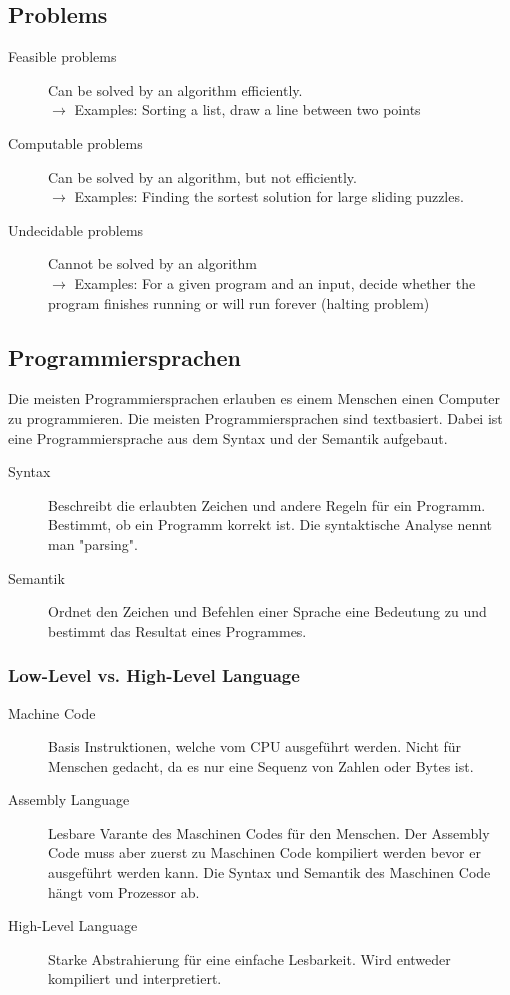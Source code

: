 \documentclass[12pt, a4paper, oneside]{article}
\begin{document}
\subsection{Problems}
\begin{description}
    \item[Feasible problems] Can be solved by an algorithm efficiently.\\
    $\rightarrow$ Examples: Sorting a list, draw a line between two points
    \item[Computable problems] Can be solved by an algorithm, but not efficiently.\\
    $\rightarrow$ Examples: Finding the sortest solution for large sliding puzzles.
    \item[Undecidable problems] Cannot be solved by an algorithm\\
    $\rightarrow$ Examples: For a given program and an input, decide whether the program finishes running or will run forever (halting problem)
\end{description}


\subsection{Programmiersprachen}
Die meisten Programmiersprachen erlauben es einem Menschen einen Computer zu programmieren. Die meisten Programmiersprachen sind textbasiert. Dabei ist eine Programmiersprache aus dem Syntax und der Semantik aufgebaut.

\begin{description}
    \item[Syntax] Beschreibt die erlaubten Zeichen und andere Regeln für ein Programm. Bestimmt, ob ein Programm korrekt ist. Die syntaktische Analyse nennt man "parsing".
    \item[Semantik] Ordnet den Zeichen und Befehlen einer Sprache eine Bedeutung zu und bestimmt das Resultat eines Programmes.
\end{description}

\subsubsection{Low-Level vs. High-Level Language}
\begin{description}
    \item[Machine Code] Basis Instruktionen, welche vom CPU ausgeführt werden. Nicht für Menschen gedacht, da es nur eine Sequenz von Zahlen oder Bytes ist.
    \item[Assembly Language] Lesbare Varante des Maschinen Codes für den Menschen. Der Assembly Code muss aber zuerst zu Maschinen Code kompiliert werden bevor er ausgeführt werden kann. Die Syntax und Semantik des Maschinen Code hängt vom Prozessor ab.
    \item[High-Level Language] Starke Abstrahierung für eine einfache Lesbarkeit. Wird entweder kompiliert und interpretiert.
\end{description}
\end{document}
